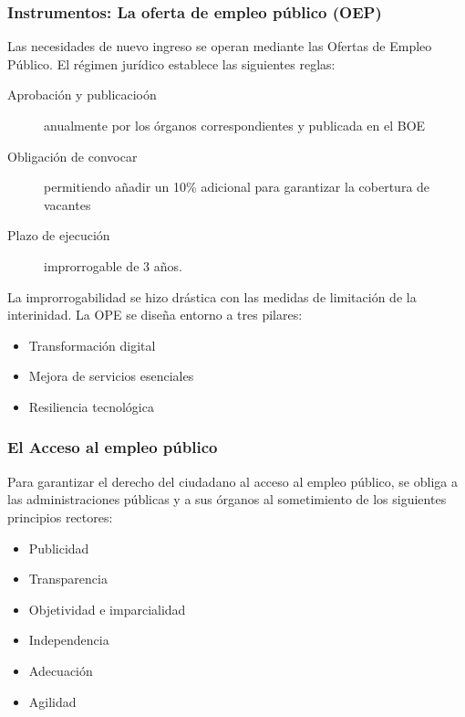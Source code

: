     \subsubsection{Instrumentos: La oferta de empleo público (OEP)} %
        Las necesidades de nuevo ingreso se operan mediante las Ofertas de Empleo Público. El régimen jurídico establece las siguientes reglas:
        \begin{description}
            \item[Aprobación y publicacioón] anualmente por los órganos correspondientes y publicada en el BOE
            \item[Obligación de convocar] permitiendo añadir un 10\% adicional para garantizar la cobertura de vacantes
            \item[Plazo de ejecución] improrrogable de 3 años.
        \end{description}

        La improrrogabilidad se hizo drástica con las medidas de limitación de la interinidad. La OPE se diseña entorno a tres pilares:
        \begin{itemize}
            \item Transformación digital
            \item Mejora de servicios esenciales
            \item Resiliencia tecnológica
        \end{itemize}

    \subsubsection{El Acceso al empleo público} %
        Para garantizar el derecho del ciudadano al acceso al empleo público, se obliga a las administraciones públicas y a sus órganos al sometimiento de los siguientes principios rectores:
        \begin{itemize}
            \item Publicidad
            \item Transparencia
            \item Objetividad e imparcialidad
            \item Independencia
            \item Adecuación
            \item Agilidad
        \end{itemize}

